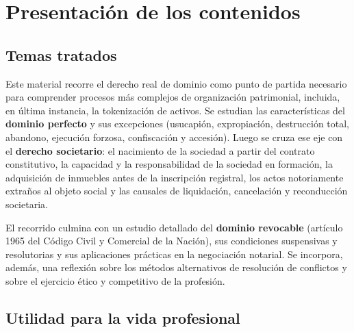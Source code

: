 \documentclass[12pt,oneside]{book}
\begin{document}
\tableofcontents
\clearpage
{}

\chapter*{Presentación de los contenidos}

\section*{Temas tratados}

Este material recorre el derecho real de dominio como punto de partida necesario para comprender procesos más complejos de organización patrimonial, incluida, en última instancia, la tokenización de activos. Se estudian las características del \textbf{dominio perfecto} y sus excepciones (usucapión, expropiación, destrucción total, abandono, ejecución forzosa, confiscación y accesión). Luego se cruza ese eje con el \textbf{derecho societario}: el nacimiento de la sociedad a partir del contrato constitutivo, la capacidad y la responsabilidad de la sociedad en formación, la adquisición de inmuebles antes de la inscripción registral, los actos notoriamente extraños al objeto social y las causales de liquidación, cancelación y reconducción societaria.

El recorrido culmina con un estudio detallado del \textbf{dominio revocable} (artículo 1965 del Código Civil y Comercial de la Nación), sus condiciones suspensivas y resolutorias y sus aplicaciones prácticas en la negociación notarial. Se incorpora, además, una reflexión sobre los métodos alternativos de resolución de conflictos y sobre el ejercicio ético y competitivo de la profesión.

\section*{Utilidad para la vida profesional}
\end{document}

